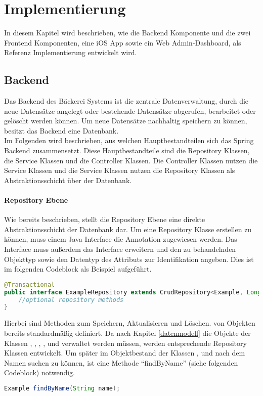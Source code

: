 \chapter{Implementierung}
In diesem Kapitel wird beschrieben, wie die Backend Komponente und die zwei Frontend Komponenten, eine iOS App sowie ein Web Admin-Dashboard, als Referenz Implementierung entwickelt wird. 

\section{Backend} \label{backend}
Das Backend des Bäckerei Systems ist die zentrale Datenverwaltung, durch die neue Datensätze angelegt oder bestehende Datensätze abgerufen, bearbeitet oder gelöscht werden können. Um neue Datensätze nachhaltig speichern zu können, besitzt das Backend eine Datenbank.
\\
Im Folgenden wird beschrieben, aus welchen Hauptbestandteilen sich das Spring Backend zusammensetzt.
Diese Hauptbestandteile sind die Repository Klassen, die Service Klassen und die Controller Klassen.
Die Controller Klassen nutzen die Service Klassen und die Service Klassen nutzen die Repository Klassen als Abstraktionsschicht über der Datenbank.

\clearpage

\subsubsection{Repository Ebene}
Wie bereits beschrieben, stellt die Repository Ebene eine direkte Abstraktionsschicht der Datenbank dar.
Um eine Repository Klasse erstellen zu können, muss einem Java Interface die Annotation  zugewiesen werden. Das Interface muss außerdem das Interface  erweitern und den zu behandelnden Objekttyp sowie den Datentyp des Attributs zur Identifikation angeben. Dies ist im folgenden Codeblock als Beispiel aufgeführt.
\begin{lstlisting}[language=Java]
@Transactional
public interface ExampleRepository extends CrudRepository<Example, Long> {
	//optional repository methods
}
\end{lstlisting}

Hierbei sind Methoden zum Speichern, Aktualisieren und Löschen. von Objekten bereits standardmäßig definiert.
Da nach Kapitel \ref{datenmodell} die Objekte der Klassen , , , ,  und  verwaltet werden müssen, werden entsprechende Repository Klassen entwickelt.
Um später im Objektbestand der Klassen ,  und  nach dem Namen suchen zu können, ist eine Methode \enquote{findByName} (siehe folgenden Codeblock) notwendig.
\begin{lstlisting}[language=Java]
Example findByName(String name);
\end{lstlisting}

